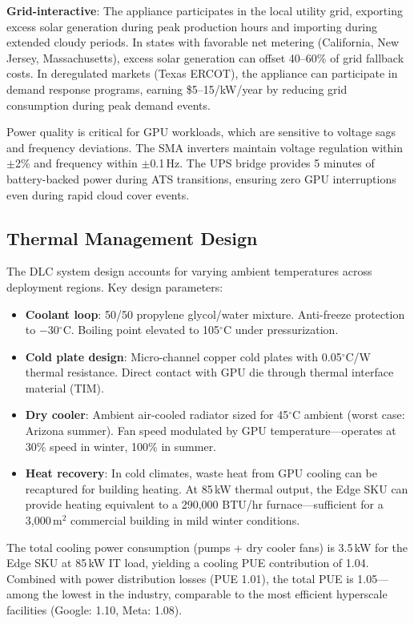 \documentclass[conference,10pt,letterpaper]{IEEEtran}
\begin{document}
\textbf{Grid-interactive}: The appliance participates in the local utility grid, exporting excess solar generation during peak production hours and importing during extended cloudy periods. In states with favorable net metering (California, New Jersey, Massachusetts), excess solar generation can offset 40--60\% of grid fallback costs. In deregulated markets (Texas ERCOT), the appliance can participate in demand response programs, earning \$5--15/kW/year by reducing grid consumption during peak demand events.

Power quality is critical for GPU workloads, which are sensitive to voltage sags and frequency deviations. The SMA inverters maintain voltage regulation within $\pm$2\% and frequency within $\pm$0.1\,Hz. The UPS bridge provides 5 minutes of battery-backed power during ATS transitions, ensuring zero GPU interruptions even during rapid cloud cover events.

\subsection{Thermal Management Design}

The DLC system design accounts for varying ambient temperatures across deployment regions. Key design parameters:

\begin{itemize}
\item \textbf{Coolant loop}: 50/50 propylene glycol/water mixture. Anti-freeze protection to $-$30$^\circ$C. Boiling point elevated to 105$^\circ$C under pressurization.
\item \textbf{Cold plate design}: Micro-channel copper cold plates with 0.05$^\circ$C/W thermal resistance. Direct contact with GPU die through thermal interface material (TIM).
\item \textbf{Dry cooler}: Ambient air-cooled radiator sized for 45$^\circ$C ambient (worst case: Arizona summer). Fan speed modulated by GPU temperature---operates at 30\% speed in winter, 100\% in summer.
\item \textbf{Heat recovery}: In cold climates, waste heat from GPU cooling can be recaptured for building heating. At 85\,kW thermal output, the Edge SKU can provide heating equivalent to a 290,000 BTU/hr furnace---sufficient for a 3,000\,m$^2$ commercial building in mild winter conditions.
\end{itemize}

The total cooling power consumption (pumps + dry cooler fans) is 3.5\,kW for the Edge SKU at 85\,kW IT load, yielding a cooling PUE contribution of 1.04. Combined with power distribution losses (PUE 1.01), the total PUE is 1.05---among the lowest in the industry, comparable to the most efficient hyperscale facilities (Google: 1.10, Meta: 1.08).
\end{document}
